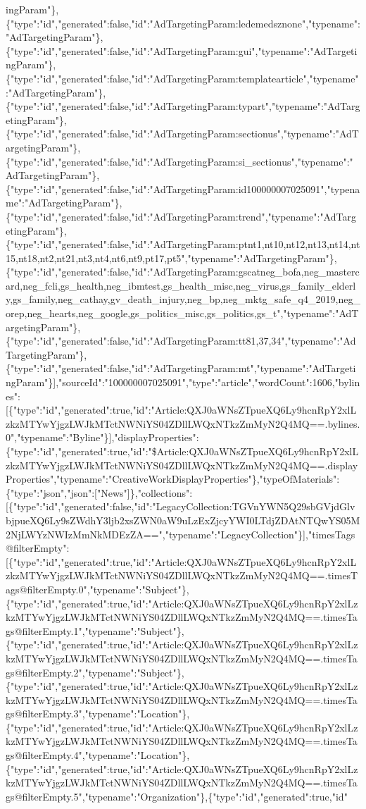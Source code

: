 ingParam"\},\{"type":"id","generated":false,"id":"AdTargetingParam:ledemedsznone","typename":"AdTargetingParam"\},\{"type":"id","generated":false,"id":"AdTargetingParam:gui","typename":"AdTargetingParam"\},\{"type":"id","generated":false,"id":"AdTargetingParam:templatearticle","typename":"AdTargetingParam"\},\{"type":"id","generated":false,"id":"AdTargetingParam:typart","typename":"AdTargetingParam"\},\{"type":"id","generated":false,"id":"AdTargetingParam:sectionus","typename":"AdTargetingParam"\},\{"type":"id","generated":false,"id":"AdTargetingParam:si\_sectionus","typename":"AdTargetingParam"\},\{"type":"id","generated":false,"id":"AdTargetingParam:id100000007025091","typename":"AdTargetingParam"\},\{"type":"id","generated":false,"id":"AdTargetingParam:trend","typename":"AdTargetingParam"\},\{"type":"id","generated":false,"id":"AdTargetingParam:ptnt1,nt10,nt12,nt13,nt14,nt15,nt18,nt2,nt21,nt3,nt4,nt6,nt9,pt17,pt5","typename":"AdTargetingParam"\},\{"type":"id","generated":false,"id":"AdTargetingParam:gscatneg\_bofa,neg\_mastercard,neg\_fcli,gs\_health,neg\_ibmtest,gs\_health\_misc,neg\_virus,gs\_family\_elderly,gs\_family,neg\_cathay,gv\_death\_injury,neg\_bp,neg\_mktg\_safe\_q4\_2019,neg\_orep,neg\_hearts,neg\_google,gs\_politics\_misc,gs\_politics,gs\_t","typename":"AdTargetingParam"\},\{"type":"id","generated":false,"id":"AdTargetingParam:tt81,37,34","typename":"AdTargetingParam"\},\{"type":"id","generated":false,"id":"AdTargetingParam:mt","typename":"AdTargetingParam"\}{]},"sourceId":"100000007025091","type":"article","wordCount":1606,"bylines":{[}\{"type":"id","generated":true,"id":"Article:QXJ0aWNsZTpueXQ6Ly9hcnRpY2xlLzkzMTYwYjgzLWJkMTctNWNiYS04ZDllLWQxNTkzZmMyN2Q4MQ==.bylines.0","typename":"Byline"\}{]},"displayProperties":\{"type":"id","generated":true,"id":"\$Article:QXJ0aWNsZTpueXQ6Ly9hcnRpY2xlLzkzMTYwYjgzLWJkMTctNWNiYS04ZDllLWQxNTkzZmMyN2Q4MQ==.displayProperties","typename":"CreativeWorkDisplayProperties"\},"typeOfMaterials":\{"type":"json","json":{[}"News"{]}\},"collections":{[}\{"type":"id","generated":false,"id":"LegacyCollection:TGVnYWN5Q29sbGVjdGlvbjpueXQ6Ly9sZWdhY3ljb2xsZWN0aW9uLzExZjcyYWI0LTdjZDAtNTQwYS05M2NjLWYzNWIzMmNkMDEzZA==","typename":"LegacyCollection"\}{]},"timesTags@filterEmpty":{[}\{"type":"id","generated":true,"id":"Article:QXJ0aWNsZTpueXQ6Ly9hcnRpY2xlLzkzMTYwYjgzLWJkMTctNWNiYS04ZDllLWQxNTkzZmMyN2Q4MQ==.timesTags@filterEmpty.0","typename":"Subject"\},\{"type":"id","generated":true,"id":"Article:QXJ0aWNsZTpueXQ6Ly9hcnRpY2xlLzkzMTYwYjgzLWJkMTctNWNiYS04ZDllLWQxNTkzZmMyN2Q4MQ==.timesTags@filterEmpty.1","typename":"Subject"\},\{"type":"id","generated":true,"id":"Article:QXJ0aWNsZTpueXQ6Ly9hcnRpY2xlLzkzMTYwYjgzLWJkMTctNWNiYS04ZDllLWQxNTkzZmMyN2Q4MQ==.timesTags@filterEmpty.2","typename":"Subject"\},\{"type":"id","generated":true,"id":"Article:QXJ0aWNsZTpueXQ6Ly9hcnRpY2xlLzkzMTYwYjgzLWJkMTctNWNiYS04ZDllLWQxNTkzZmMyN2Q4MQ==.timesTags@filterEmpty.3","typename":"Location"\},\{"type":"id","generated":true,"id":"Article:QXJ0aWNsZTpueXQ6Ly9hcnRpY2xlLzkzMTYwYjgzLWJkMTctNWNiYS04ZDllLWQxNTkzZmMyN2Q4MQ==.timesTags@filterEmpty.4","typename":"Location"\},\{"type":"id","generated":true,"id":"Article:QXJ0aWNsZTpueXQ6Ly9hcnRpY2xlLzkzMTYwYjgzLWJkMTctNWNiYS04ZDllLWQxNTkzZmMyN2Q4MQ==.timesTags@filterEmpty.5","typename":"Organization"\},\{"type":"id","generated":true,"id"